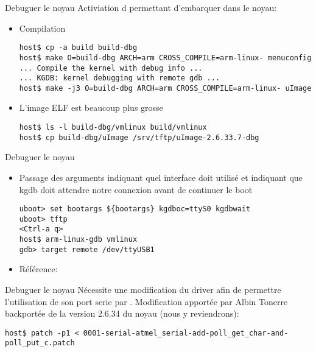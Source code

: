 
\begin{frame}[fragile=singleslide]{Debuguer le noyau}
  Activiation d  permettant d'embarquer  dans
  le noyau:
  \begin{itemize}
  \item Compilation
    \begin{lstlisting}
host$ cp -a build build-dbg
host$ make O=build-dbg ARCH=arm CROSS_COMPILE=arm-linux- menuconfig
... Compile the kernel with debug info ...
... KGDB: kernel debugging with remote gdb ...
host$ make -j3 O=build-dbg ARCH=arm CROSS_COMPILE=arm-linux- uImage
    \end{lstlisting} 
  \item L'image ELF est beaucoup plus grosse
    \begin{lstlisting}
host$ ls -l build-dbg/vmlinux build/vmlinux
host$ cp build-dbg/uImage /srv/tftp/uImage-2.6.33.7-dbg
    \end{lstlisting} 
  \end{itemize}
\end{frame}
\begin{frame}[fragile=singleslide]{Debuguer le noyau}
  \begin{itemize}
  \item  Passage des arguments   indiquant  quel interface
     doit utilisé et   indiquant que kgdb doit
    attendre notre connexion avant de continuer le boot
    \begin{lstlisting}
uboot> set bootargs ${bootargs} kgdboc=ttyS0 kgdbwait
uboot> tftp
<Ctrl-a q>
host$ arm-linux-gdb vmlinux 
gdb> target remote /dev/ttyUSB1
    \end{lstlisting} 
    \item Référence: 
  \end{itemize}
\end{frame}

\begin{frame}[fragile=singleslide]{Debuguer le noyau}
  Nécessite  une modification  du driver    afin de
  permettre   l'utilisation  de   son  port   serie   par  .
  Modification  apportée par  Albin Tonerre  backportée de  la version
  2.6.34 du noyau (nous y reviendrons):
  \begin{lstlisting}
host$ patch -p1 < 0001-serial-atmel_serial-add-poll_get_char-and-poll_put_c.patch 
  \end{lstlisting} 

\end{frame}

